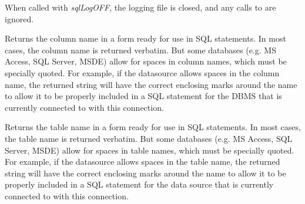 When called with {\it sqlLogOFF}, the logging file is closed, and any calls to  are ignored.

\label{wxdbsqlcolumnname}


Returns the column name in a form ready for use in SQL statements.
In most cases, the column name is returned verbatim.  But some databases
(e.g. MS Access, SQL Server, MSDE) allow for spaces in column names, which
must be specially quoted.  For example, if the datasource allows spaces
in the column name, the returned string will have the correct enclosing
marks around the name to allow it to be properly included in a SQL statement
for the DBMS that is currently connected to with this connection.





\label{wxdbsqltablename}


Returns the table name in a form ready for use in SQL statements.
In most cases, the table name is returned verbatim.  But some databases
(e.g. MS Access, SQL Server, MSDE) allow for spaces in table names, which
must be specially quoted.  For example, if the datasource allows spaces
in the table name, the returned string will have the correct enclosing
marks around the name to allow it to be properly included in a SQL statement
for the data source that is currently connected to with this connection.





\label{wxdbtableexists}

